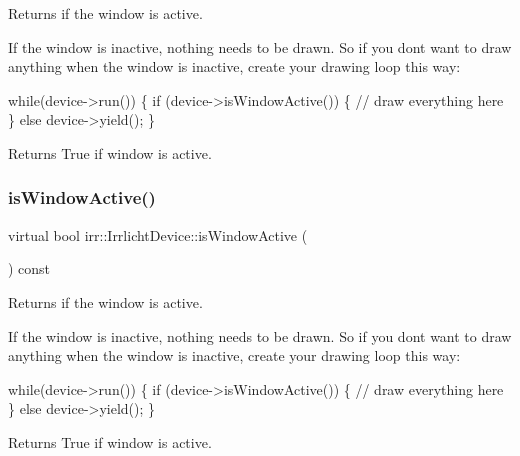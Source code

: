 Returns if the window is active. 

If the window is inactive, nothing needs to be drawn. So if you don\textquotesingle{}t want to draw anything when the window is inactive, create your drawing loop this way\+: 
\begin{DoxyCode}
\textcolor{keywordflow}{while}(device->run())
\{
    \textcolor{keywordflow}{if} (device->isWindowActive())
    \{
        \textcolor{comment}{// draw everything here}
    \}
    \textcolor{keywordflow}{else}
        device->yield();
\}
\end{DoxyCode}
 \begin{DoxyReturn}{Returns}
True if window is active. 
\end{DoxyReturn}
\mbox{\label{classirr_1_1IrrlichtDevice_abd3c88336b739da2694883d5ffd25a70}} 
\subsubsection{\texorpdfstring{is\+Window\+Active()}{isWindowActive()}\hspace{0.1cm}{\footnotesize\ttfamily [2/2]}}
{\footnotesize\ttfamily virtual bool irr\+::\+Irrlicht\+Device\+::is\+Window\+Active (\begin{DoxyParamCaption}{ }\end{DoxyParamCaption}) const\hspace{0.3cm}{\ttfamily [pure virtual]}}



Returns if the window is active. 

If the window is inactive, nothing needs to be drawn. So if you don\textquotesingle{}t want to draw anything when the window is inactive, create your drawing loop this way\+: 
\begin{DoxyCode}
\textcolor{keywordflow}{while}(device->run())
\{
    \textcolor{keywordflow}{if} (device->isWindowActive())
    \{
        \textcolor{comment}{// draw everything here}
    \}
    \textcolor{keywordflow}{else}
        device->yield();
\}
\end{DoxyCode}
 \begin{DoxyReturn}{Returns}
True if window is active. 
\end{DoxyReturn}
\mbox{\label{classirr_1_1IrrlichtDevice_a960069dc52b4f1303d18945dcbad7f3a}} 
